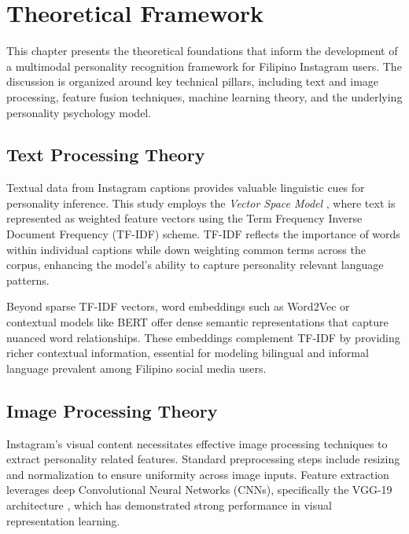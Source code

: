%
%
%                 

\chapter{Theoretical Framework}
\label{sec:theoframework}

This chapter presents the theoretical foundations that inform the development of a multimodal personality recognition framework for Filipino Instagram users. The discussion is organized around key technical pillars, including text and image processing, feature fusion techniques, machine learning theory, and the underlying personality psychology model.

\section{Text Processing Theory}

Textual data from Instagram captions provides valuable linguistic cues for personality inference. This study employs the \textit{Vector Space Model} \citep{salton1975}, where text is represented as weighted feature vectors using the Term Frequency Inverse Document Frequency (TF-IDF) scheme. TF-IDF reflects the importance of words within individual captions while down weighting common terms across the corpus, enhancing the model's ability to capture personality relevant language patterns.

Beyond sparse TF-IDF vectors, word embeddings such as Word2Vec or contextual models like BERT offer dense semantic representations that capture nuanced word relationships. These embeddings complement TF-IDF by providing richer contextual information, essential for modeling bilingual and informal language prevalent among Filipino social media users.

\section{Image Processing Theory}

Instagram's visual content necessitates effective image processing techniques to extract personality related features. Standard preprocessing steps include resizing and normalization to ensure uniformity across image inputs. Feature extraction leverages deep Convolutional Neural Networks (CNNs), specifically the VGG-19 architecture \citep{simonyan2015}, which has demonstrated strong performance in visual representation learning.

